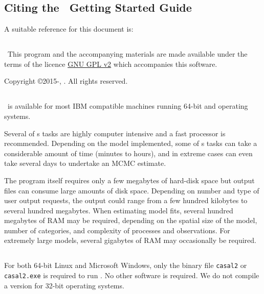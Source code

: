 \subsection{Citing the \CNAME\ Getting Started Guide}
A suitable reference for this document is: 

\ManualRef{}
 
\subsection{}
\
This program and the accompanying materials are made available under the terms of the licence \href{http://www.gnu.org/licenses/old-licenses/gpl-2.0.en.html}{GNU GPL v2} which accompanies this software.

Copyright \copyright 2015-\SourceControlYearDoc, \href{http://www.niwa.co.nz}{\Organisation}. All rights reserved.

\subsection{}

\CNAME\ is available for most IBM compatible machines running 64-bit  and  operating systems.

Several of \CNAME s tasks are highly computer intensive and a fast processor is recommended. Depending on the model implemented, some of \CNAME s tasks can take a considerable amount of time (minutes to hours), and in extreme cases can even take several days to undertake an MCMC estimate. 

The program itself requires only a few megabytes of hard-disk space but output files can consume large amounts of disk space. Depending on number and type of user output requests, the output could range from a few hundred kilobytes to several hundred megabytes. When estimating model fits, several hundred megabytes of RAM may be required, depending on the spatial size of the model, number of categories, and complexity of processes and observations. For extremely large models, several gigabytes of RAM may occasionally be required. 

\subsection{}

For both 64-bit Linux and Microsoft Windows, only the binary file \texttt{casal2} or \texttt{casal2.exe} is required to run \CNAME . No other software is required. We do not compile a version for 32-bit operating systems. 

